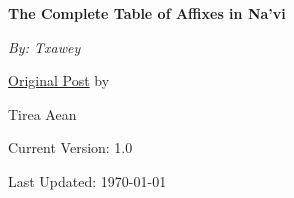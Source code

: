 \documentclass[12pt,a4paper,titlepage, dvipsnames]{book}
\begin{document}
\begin{titlepage}
	\centering
	\vspace*{3.5cm}
	\vspace*{1.5cm}

	{\huge\bfseries The Complete Table of Affixes in Na'vi\par}
	\vspace{2cm}
	{\Large\itshape By: Txawey\par}
	\vfill
	\href{https://forum.learnnavi.org/prefixes-infixes-and-suffixes/easy-guide-to-navi-prefixes-infixes-and-suffixes-ii/}{Original Post} by\par
	Tirea Aean 

	\vspace{2cm}
	\vfill
\scriptsize Current Version: 1.0\par
\scriptsize Last Updated: \today\par
\end{titlepage}


\printindex
\end{document}
